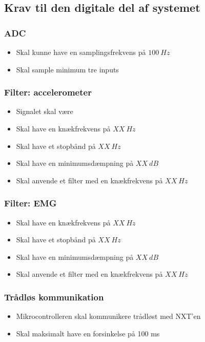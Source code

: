 \subsection{Krav til den digitale del af systemet}

\subsubsection{ADC}
\begin{itemize}
\item Skal kunne have en samplingsfrekvens på $100~Hz$
\item Skal sample minimum tre inputs 
\end{itemize}

\subsubsection{Filter: accelerometer}
\begin{itemize}
\item Signalet skal være 
\item Skal have en knækfrekvens på $XX~Hz$
\item Skal have et stopbånd på $XX~Hz$
\item Skal have en minimumsdæmpning på $XX~dB$
\item Skal anvende et filter med en knækfrekvens på $XX~Hz$
\end{itemize}

\subsubsection{Filter: EMG}
\begin{itemize}
\item Skal have en knækfrekvens på $XX~Hz$
\item Skal have et stopbånd på $XX~Hz$
\item Skal have en minimumsdæmpning på $XX~dB$
\item Skal anvende et filter med en knækfrekvens på $XX~Hz$
\end{itemize}


\subsubsection{Trådløs kommunikation}
\begin{itemize}
\item Mikrocontrolleren skal kommunikere trådløst med NXT'en 
\item Skal maksimalt have en forsinkelse på 100 ms
\end{itemize}